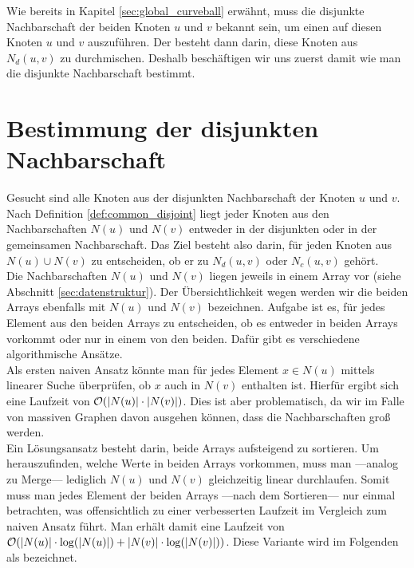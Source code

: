 Wie bereits in Kapitel \ref{sec:global_curveball} erwähnt, muss die disjunkte Nachbarschaft
der beiden Knoten $u$ und $v$ bekannt sein, um einen \ct{} auf diesen Knoten $u$ und $v$
auszuführen. Der \ct{} besteht dann darin, diese Knoten aus $N_{d}(u,v)$ zu durchmischen.
Deshalb beschäftigen wir uns zuerst damit wie man die disjunkte Nachbarschaft bestimmt.


\section{Bestimmung der disjunkten Nachbarschaft}
\label{sec:common}
Gesucht sind alle Knoten aus der disjunkten Nachbarschaft der Knoten $u$ und $v$.
Nach Definition \ref{def:common_disjoint} liegt jeder Knoten aus den Nachbarschaften $N(u)$ und $N(v)$ 
entweder in der disjunkten oder in der gemeinsamen Nachbarschaft. Das Ziel besteht also darin, 
für jeden Knoten aus $N(u) \cup N(v)$ zu entscheiden, ob er zu $N_{d}(u,v)$ oder $N_{c}(u,v)$ gehört.
\\

Die Nachbarschaften $N(u)$ und $N(v)$ liegen jeweils
in einem Array vor (siehe Abschnitt \ref{sec:datenstruktur}). Der Übersichtlichkeit 
wegen werden wir die beiden
Arrays ebenfalls mit $N(u)$ und $N(v)$ bezeichnen. Aufgabe ist es,
 für jedes Element aus den beiden Arrays zu entscheiden,
ob es entweder in beiden Arrays vorkommt oder nur in einem von den beiden. Dafür 
gibt es verschiedene algorithmische Ansätze.
\\

Als ersten naiven Ansatz könnte man für jedes Element $x \in N(u)$ mittels
 linearer Suche überprüfen, ob $x$ auch in $N(v)$ enthalten ist. Hierfür ergibt sich eine Laufzeit von
$\mathcal{O}(|N(u)|\cdot|N(v)|)$. Dies ist aber problematisch, da wir 
im Falle von massiven Graphen davon ausgehen können, dass die Nachbarschaften
 groß werden. 
\\

Ein Lösungsansatz besteht darin, beide Arrays aufsteigend zu sortieren. 
Um herauszufinden,
welche Werte in beiden Arrays vorkommen, muss man ---analog zu Merge--- lediglich $N(u)$ und $N(v)$
gleichzeitig linear durchlaufen. Somit muss man jedes 
Element der beiden Arrays ---nach dem Sortieren--- 
nur einmal betrachten, was offensichtlich zu einer verbesserten Laufzeit im Vergleich zum naiven
Ansatz führt. Man erhält damit eine Laufzeit von $\mathcal{O}(|N(u)|\cdot \log (|N(u)|)  + |N(v)|\cdot\log(|N(v)|))$. 
Diese Variante wird im Folgenden als \SorSor{} bezeichnet. 
\\

